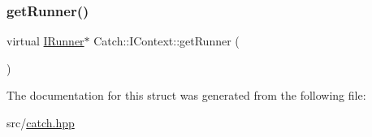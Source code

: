 \mbox{\label{struct_catch_1_1_i_context_af088415dde18d039ed5a2f95b02767c6}} 
\subsubsection{\texorpdfstring{get\+Runner()}{getRunner()}}
{\footnotesize\ttfamily virtual \hyperlink{struct_catch_1_1_i_runner}{I\+Runner}$\ast$ Catch\+::\+I\+Context\+::get\+Runner (\begin{DoxyParamCaption}{ }\end{DoxyParamCaption})\hspace{0.3cm}{\ttfamily [pure virtual]}}



The documentation for this struct was generated from the following file\+:\begin{DoxyCompactItemize}
\item 
src/\hyperlink{catch_8hpp}{catch.\+hpp}\end{DoxyCompactItemize}
